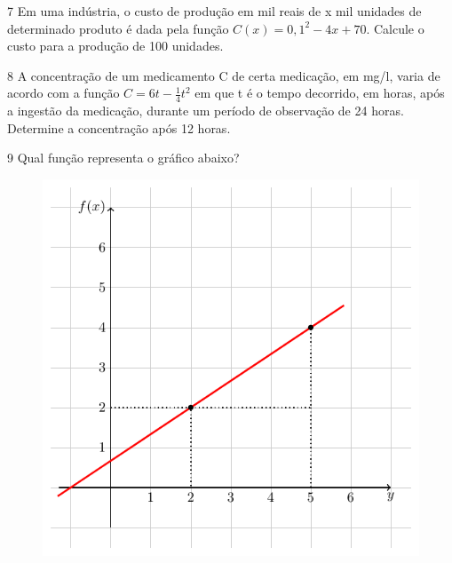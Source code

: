 \num{7} Em uma indústria, o custo de produção em mil reais de x mil unidades
de determinado produto é dada pela função $ C(x) = 0,1^2 - 4x + 70$. Calcule 
o custo para a produção de 100 unidades.
\enlargethispage{2\baselineskip}



\num{8} A concentração de um medicamento C de certa medicação, em mg/l, varia de
acordo com a função $C = 6t - \frac{1}{4} t^2$ em que t é o tempo decorrido, em 
horas, após a ingestão da medicação, durante um período de observação de 24 horas.
Determine a concentração após 12 horas.

\begin{emptybox}
\end{emptybox}

\num{9} Qual função representa o gráfico abaixo?

\begin{figure}[htpb!]
\centering
\includegraphics[width=.65\textwidth]{./tikz/009.pdf}
\end{figure}

\begin{emptybox}
\end{emptybox}


